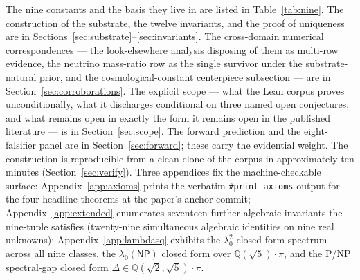 \documentclass[11pt,a4paper]{amsart}
\theoremstyle{plain}
\theoremstyle{definition}
\begin{document}
The nine constants and the basis they live in are listed in Table~\ref{tab:nine}. The construction of the substrate, the twelve invariants, and the proof of uniqueness are in Sections~\ref{sec:substrate}--\ref{sec:invariants}. The cross-domain numerical correspondences --- the look-elsewhere analysis disposing of them as multi-row evidence, the neutrino mass-ratio row as the single survivor under the substrate-natural prior, and the cosmological-constant centerpiece subsection --- are in Section~\ref{sec:corroborations}. The explicit scope --- what the Lean corpus proves unconditionally, what it discharges conditional on three named open conjectures, and what remains open in exactly the form it remains open in the published literature --- is in Section~\ref{sec:scope}. The forward prediction and the eight-falsifier panel are in Section~\ref{sec:forward}; these carry the evidential weight. The construction is reproducible from a clean clone of the corpus in approximately ten minutes (Section~\ref{sec:verify}). Three appendices fix the machine-checkable surface: Appendix~\ref{app:axioms} prints the verbatim \texttt{\#print axioms} output for the four headline theorems at the paper's anchor commit; Appendix~\ref{app:extended} enumerates seventeen further algebraic invariants the nine-tuple satisfies (twenty-nine simultaneous algebraic identities on nine real unknowns); Appendix~\ref{app:lambdasq} exhibits the $\lambda_0^2$ closed-form spectrum across all nine classes, the $\lambda_0(\textsf{NP})$ closed form over $\mathbb{Q}(\sqrt{5})\cdot\pi$, and the P/NP spectral-gap closed form $\Delta \in \mathbb{Q}(\sqrt{2}, \sqrt{5})\cdot\pi$.
\end{document}
